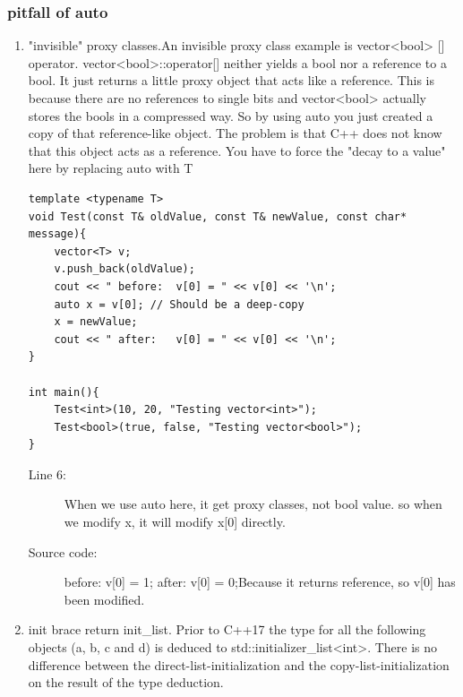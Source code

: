 \documentclass[a4paper,11pt,twoside]{book}
\begin{document}
\subsubsection{pitfall of auto}
	\begin{enumerate}
		\item "invisible" proxy classes.An invisible proxy class example is vector<bool> [] operator. vector<bool>::operator[] neither yields a bool nor a reference to a bool. It just returns a little proxy object that acts like a reference. This is because there are no references to single bits and vector<bool> actually stores the bools in a compressed way. So by using auto you just created a copy of that reference-like object. The problem is that C++ does not know that this object acts as a reference. You have to force the "decay to a value" here by replacing auto with T
\begin{lstlisting}
template <typename T>
void Test(const T& oldValue, const T& newValue, const char* message){
	vector<T> v;
	v.push_back(oldValue);
	cout << " before:  v[0] = " << v[0] << '\n';
	auto x = v[0]; // Should be a deep-copy
	x = newValue;
	cout << " after:   v[0] = " << v[0] << '\n';
}

int main(){
	Test<int>(10, 20, "Testing vector<int>");
	Test<bool>(true, false, "Testing vector<bool>");
}
\end{lstlisting}
\begin{description}
	\item[Line 6:] When we use auto here, it get proxy classes, not bool value. so when we modify x, it will modify x[0] directly.
	
	\item[Source code:] before:  v[0] = 1; after:   v[0] = 0;Because it returns reference,  so v[0] has been modified.
\end{description}

		\item init brace return init\_list. Prior to C++17 the type for all the following objects (a, b, c and d) is deduced to std::initializer\_list<int>. There is no difference between the direct-list-initialization and the copy-list-initialization on the result of the type deduction.
		

\end{enumerate}
\end{document}
